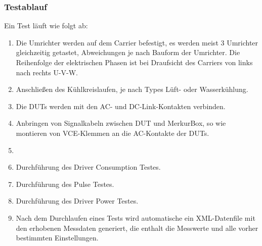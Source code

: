 \subsubsection{Testablauf}
Ein Test läuft wie folgt ab:

\begin{enumerate}
\item Die Umrichter werden auf dem Carrier befestigt, es werden meist 3 Umrichter gleichzeitig getastet, Abweichungen je nach Bauform der Umrichter.
Die Reihenfolge der elektrischen Phasen ist bei Draufsicht des Carriers von links nach rechts U-V-W.
\item Anschließen des Kühlkreislaufen, je nach Types Lüft- oder Wasserkühlung.
\item Die \ac{DUTs} werden mit den AC- und DC-Link-Kontakten verbinden.
\item Anbringen von Signalkabeln zwischen DUT und MerkurBox, so wie montieren von VCE-Klemmen an die AC-Kontakte der \ac{DUTs}.
\item
\item Durchführung des Driver Consumption Testes.
\item Durchführung des Pulse Testes.
\item Durchführung des Driver Power Testes.
\item Nach dem Durchlaufen eines Tests wird automatische ein XML-Datenfile mit den erhobenen Messdaten generiert, die enthalt die Messwerte und alle vorher bestimmten Einstellungen.
\end{enumerate}

